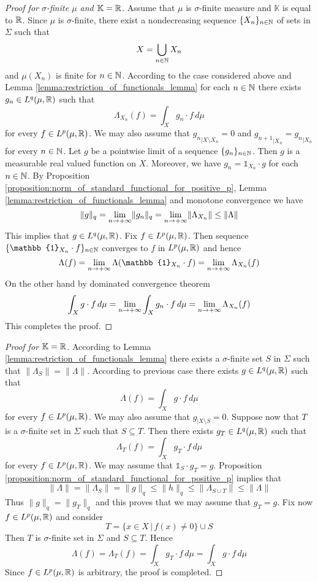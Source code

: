 \begin{proof}[Proof for $\sigma$-finite $\mu$ and $\mathbb{K}={\mathbb R}$]
Assume that $\mu$ is $\sigma$-finite measure and $\mathbb{K}$ is equal to ${\mathbb R}$. Since $\mu$ is $\sigma$-finite, there exist a nondecreasing sequence $\{X_n\}_{n\in {\mathbb N}}$ of sets in $\Sigma$ such that 
$$X = \bigcup_{n\in {\mathbb N}}X_n$$
and $\mu(X_n)$ is finite for $n\in {\mathbb N}$. According to the case considered above and Lemma \ref{lemma:restriction_of_functionals_lemma} for each $n \in {\mathbb N}$ there exists $g_n\in L^q(\mu,{\mathbb R})$ such that
$$\Lambda_{X_n}\left(f\right) = \int_Xg_n\cdot f\,d\mu$$
for every $f \in L^p(\mu,{\mathbb R})$. We may also assume that ${g_n}_{\mid X\setminus X_n} = 0$ and ${g_{n+1}}_{\mid X_n} = {g_n}_{\mid X_n}$ for every $n \in {\mathbb N}$. Let $g$ be a pointwise limit of a sequence $\{g_n\}_{n\in {\mathbb N}}$. Then $g$ is a measurable real valued function on $X$. Moreover, we have $g_n = \mathbb{1}_{X_n}\cdot g$ for each $n \in {\mathbb N}$. By Proposition \ref{proposition:norm_of_standard_functional_for_positive_p}, Lemma \ref{lemma:restriction_of_functionals_lemma} and monotone convergence we have
$$\lVert g \rVert_q = \lim_{n\rightarrow +\infty}\lVert g_n\rVert_q = \lim_{n\rightarrow +\infty}\lVert \Lambda_{X_n} \rVert \leq \lVert \Lambda \rVert$$
This implies that $g \in L^q(\mu,{\mathbb R})$. Fix $f \in L^p(\mu, {\mathbb R})$. Then sequence $\{\mathbb{1}_{X_n}\cdot f\}_{n \in \NN}$ converges to $f$ in $L^p(\mu,{\mathbb R})$ and hence
$$\Lambda(f) = \lim_{n\ra +\infty}\Lambda(\mathbb{1}_{X_n}\cdot f) = \lim_{n\ra +\infty}\Lambda_{X_n}(f)$$
On the other hand by dominated convergence theorem
$$\int_Xg\cdot f\,d\mu = \lim_{n\rightarrow +\infty}\int_Xg_n\cdot f\,d\mu = \lim_{n\rightarrow +\infty}\Lambda_{X_n}(f)$$
This completes the proof.
\end{proof}


\begin{proof}[Proof for $\mathbb{K} = {\mathbb R}$]
According to Lemma \ref{lemma:restriction_of_functionals_lemma} there exists a $\sigma$-finite set $S$ in $\Sigma$ such that $\lVert \Lambda_S \rVert = \lVert \Lambda \rVert$. According to previous case there exists $g \in L^q(\mu,{\mathbb R})$ such that 
$$\Lambda(f) = \int_Xg\cdot f\,d\mu$$
for every $f \in L^p(\mu,{\mathbb R})$. We may also assume that $g_{\mid X\setminus S} = 0$. Suppose now that $T$ is a $\sigma$-finite set in $\Sigma$ such that $S\subseteq T$. Then there exists $g_T \in L^q(\mu,{\mathbb R})$ such that
$$\Lambda_{T}(f) = \int_Xg_T\cdot f\,d\mu$$
for every $f \in L^p(\mu,{\mathbb R})$. We may assume that $\mathbb{1}_S \cdot g_T = g$. Proposition \ref{proposition:norm_of_standard_functional_for_positive_p} implies that
$$\lVert \Lambda \rVert = \lVert \Lambda_S \rVert = \lVert g \rVert_q \leq \lVert h \rVert_q \leq \lVert \Lambda_{S\cup T}\rVert \leq \lVert \Lambda \rVert$$
Thus $\lVert g \rVert_q = \lVert g_T \rVert_q$ and this proves that we may assume that $g_T = g$. Fix now $f \in L^p(\mu,{\mathbb R})$ and consider
$$T = \big\{x\in X\,\big|\,f(x) \neq 0\big\} \cup S$$
Then $T$ is $\sigma$-finite set in $\Sigma$ and $S\subseteq T$. Hence
$$\Lambda(f) = \Lambda_T(f) = \int_Xg_T\cdot f\,d\mu = \int_Xg\cdot f\,d\mu$$
Since $f \in L^p(\mu,{\mathbb R})$ is arbitrary, the proof is completed.
\end{proof}

